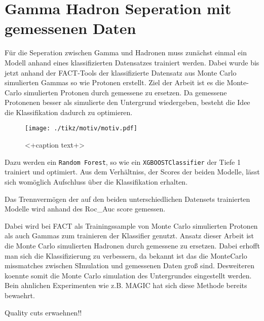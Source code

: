 \chapter{Gamma Hadron Seperation mit gemessenen Daten}
Für die Seperation zwischen Gamma und Hadronen muss zunächst einmal ein Modell anhand eines klassifizierten Datensatzes trainiert werden.
Dabei wurde bis jetzt anhand der FACT-Tools \cite{FACT-Tools} der klassifizierte Datensatz aus Monte Carlo simulierten Gammas so wie Protonen erstellt. 
Ziel der Arbeit ist es die Monte-Carlo simulierten Protonen durch gemessene zu ersetzen.
Da gemessene Protonenen besser als simulierte den Untergrund wiedergeben, besteht die Idee die Klassifikation dadurch zu optimieren.
\begin{figure}[H]
  \centering
  \texttt{[image: ./tikz/motiv/motiv.pdf]}
  \caption{<+caption text+>}
  \label{fig:<+label+>}
\end{figure}
Dazu werden ein \texttt{Random Forest}, so wie ein \texttt{XGBOOSTClassifier} der Tiefe 1 trainiert und optimiert.
Aus dem Verhältniss, der Scores der beiden Modelle, lässt sich womöglich Aufschluss über die Klassifikation erhalten.

Das Trennvermögen der auf den beiden unterschiedlichen Datensets trainierten Modelle wird anhand des Roc\_Auc score gemessen.



Dabei wird bei FACT als Trainingssample von Monte Carlo simulierten Protonen als auch Gammas zum trainieren der Klassifier genutzt.
Ansatz dieser Arbeit ist die Monte Carlo simulierten Hadronen durch gemessene zu ersetzen. 
Dabei erhofft man sich die Klassifizierung zu verbessern, da bekannt ist das die MonteCarlo missmatches zwischen SImulation und gemessenen Daten groß sind. 
Desweiteren koennte somit die Monte Carlo simulation des Untergrundes eingestellt werden. 
Bein ahnlichen Experimenten wie z.B. MAGIC hat sich diese Methode bereits bewaehrt. 

Quality cuts erwaehnen!!

